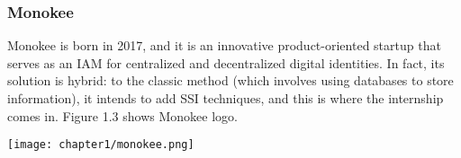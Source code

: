     \subsubsection{Monokee} 
    Monokee is born in 2017, and it is an innovative product-oriented 
    startup that serves as an IAM for centralized and decentralized digital 
    identities. In fact, its solution is hybrid: to the classic method (which 
    involves using databases to store information), it intends to add SSI techniques,
    and this is where the internship comes in. Figure 1.3 shows Monokee logo.
    \begin{center}
        \texttt{[image: chapter1/monokee.png]}
        \vspace{-0.35cm}
    \end{center}
\clearpage
